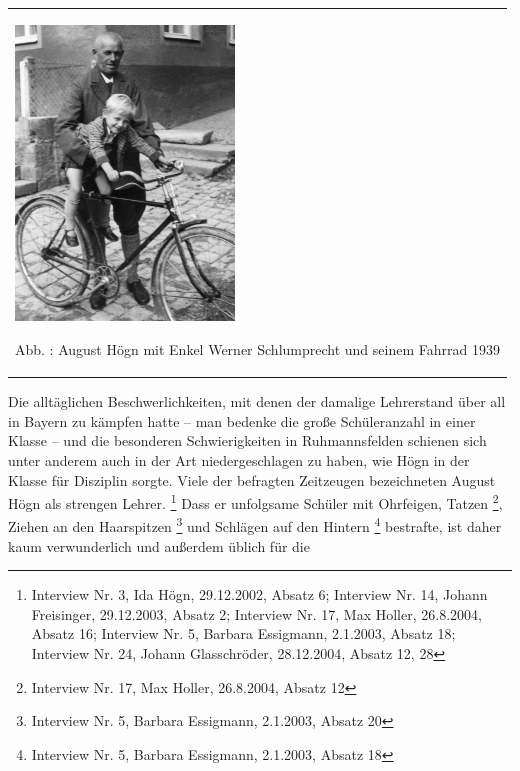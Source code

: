 \documentclass[a4paper]{article}
\newcommand\textstyleFunotenTextZchn[1]{#1}
\newcounter{Abb}
\renewcommand\theAbb{\arabic{Abb}}
\begin{document}
\begin{center}
\begin{minipage}{6.202cm}
\begin{center}
\tablefirsthead{}
\tablehead{}
\tabletail{}
\tablelasttail{}
\begin{supertabular}{m{6.0020003cm}}

\includegraphics[width=5.821cm,height=7.851cm]{pictures/zulassungsarbeit-img032.jpg}

Abb. \stepcounter{Abb}{\theAbb}: August Högn mit Enkel Werner
Schlumprecht und seinem Fahrrad 1939\\
\end{supertabular}
\end{center}
\end{minipage}
\end{center}
Die alltäglichen Beschwerlichkeiten, mit denen der damalige Lehrerstand
über all in Bayern zu kämpfen hatte – man bedenke die große
Schüleranzahl in einer Klasse – und die besonderen Schwierigkeiten in
Ruhmannsfelden schienen sich unter anderem auch in der Art
niedergeschlagen zu haben, wie Högn in der Klasse für Disziplin sorgte.
Viele der befragten Zeitzeugen bezeichneten August Högn als strengen
Lehrer. \footnote{\textstyleFunotenTextZchn{Interview Nr. 3, Ida Högn,
29.12.2002, Absatz 6; Interview Nr. 14, Johann Freisinger, 29.12.2003,
Absatz 2; Interview Nr. 17, Max Holler, 26.8.2004, Absatz 16; Interview
Nr. 5, Barbara Essigmann, 2.1.2003, Absatz 18; Interview Nr. 24, Johann
Glasschröder, 28.12.2004, Absatz 12, 28}} Dass er unfolgsame Schüler
mit Ohrfeigen, Tatzen \footnote{Interview Nr. 17, Max Holler,
26.8.2004, Absatz 12}, Ziehen an den Haarspitzen \footnote{Interview
Nr. 5, Barbara Essigmann, 2.1.2003, Absatz 20} und Schlägen auf den
Hintern \footnote{Interview Nr. 5, Barbara Essigmann, 2.1.2003, Absatz
18} bestrafte, ist daher kaum verwunderlich und außerdem üblich für die
\end{document}
